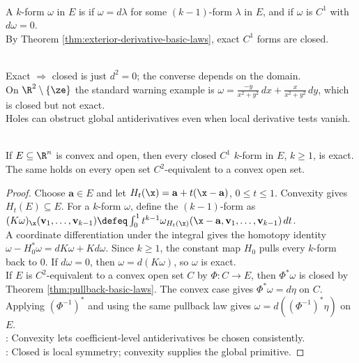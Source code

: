 \begin{definition} \label{def:closed-and-exact-forms} \\
A $k$-form $\omega$ in $E$ is  if $\omega=d\lambda$ for some $(k-1)$-form $\lambda$ in $E$, and  if $\omega$ is $C^1$ with $d\omega=0$.\\
By Theorem \ref{thm:exterior-derivative-basic-laws}, exact $C^1$ forms are closed.
\end{definition}

\begin{perspective} \label{per:closed-exact-local-global} \\
Exact $\Rightarrow$ closed is just $d^2=0$; the converse depends on the domain.\\
On $\R^2\setminus\{\ze\}$ the standard warning example is $\omega=\frac{-y}{x^2+y^2}\,dx+\frac{x}{x^2+y^2}\,dy$, which is closed but not exact.\\
Holes can obstruct global antiderivatives even when local derivative tests vanish.
\end{perspective}

\begin{theorem} \label{thm:poincare-lemma-convex-rudin} \\
If $E\subseteq\R^n$ is convex and open, then every closed $C^1$ $k$-form in $E$, $k\geq1$, is exact.\\
The same holds on every open set $C^2$-equivalent to a convex open set.
\begin{proof}
Choose $\mathbf{a}\in E$ and let $H_t(\x)=\mathbf{a}+t(\x-\mathbf{a})$, $0\leq t\leq1$. Convexity gives $H_t(E)\subseteq E$. For a $k$-form $\omega$, define the $(k-1)$-form  as $(K\omega)_{\x}(\mathbf{v}_1,\ldots,\mathbf{v}_{k-1}) \defeq \int_0^1 t^{k-1}\omega_{H_t(\x)}(\x-\mathbf{a},\mathbf{v}_1,\ldots,\mathbf{v}_{k-1})\,dt$.\\
A coordinate differentiation under the integral gives the homotopy identity $\omega-H_0^\ast\omega=dK\omega+Kd\omega$. Since $k\geq1$, the constant map $H_0$ pulls every $k$-form back to $0$. If $d\omega=0$, then $\omega=d(K\omega)$, so $\omega$ is exact.\\
If $E$ is $C^2$-equivalent to a convex open set $C$ by $\Phi:C\to E$, then $\Phi^\ast\omega$ is closed by Theorem \ref{thm:pullback-basic-laws}. The convex case gives $\Phi^\ast\omega=d\eta$ on $C$. Applying $(\Phi^{-1})^\ast$ and using the same pullback law gives $\omega=d((\Phi^{-1})^\ast\eta)$ on $E$.\\
: Convexity lets coefficient-level antiderivatives be chosen consistently.\\
: Closed is local symmetry; convexity supplies the global primitive.
\end{proof}
\end{theorem}

